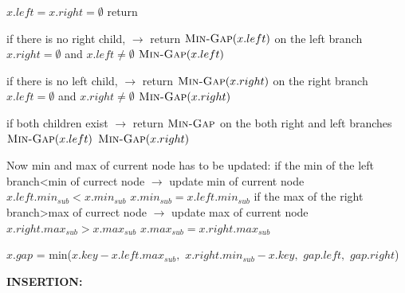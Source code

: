 \documentclass[11pt]{article}
\begin{document}
\begin{enumerate}
\begin{codebox}
		\li \If $x.left=x.right=\emptyset$ 
		\li \Do 
				return 
			\End
		
		\li \Comment if there is no right child, $\rightarrow$ return $\textnormal{\scshape Min-Gap}(x.left)$ on the left branch 
		\li \ElseIf $x.right=\emptyset$ and $x.left \neq \emptyset$ 	
		\li \Do
				$\textnormal{\scshape Min-Gap}(x.left)$		 	

		\li \Comment if there is no left child, $\rightarrow$ return $\textnormal{\scshape Min-Gap}(x.right)$ on the right branch 
		\li \ElseIf $x.left=\emptyset$ and $x.right \neq \emptyset$ 	
		\li \Do
				$\textnormal{\scshape Min-Gap}(x.right)$

		\li \Comment if both children exist $\rightarrow$ return $\textnormal{\scshape Min-Gap}$ on the both right and left branches 
		\li \Else 	
		\li \Do
				$\textnormal{\scshape Min-Gap}(x.left)$
			\li $\textnormal{\scshape Min-Gap}(x.right)$
		\End
		
		\li \Comment Now min and max of current node has to be updated:
		\li \Comment if the min of the left branch<min of currect node $\rightarrow$ update min of current node
	 	\li \If $x.left.min_{sub} < x.min_{sub}$
		 	\li \Do 
			 	$ x.min_{sub}= x.left.min_{sub}$
			\End
		\li \Comment if the max of the right branch>max of currect node $\rightarrow$ update max of current node
		\li \If $x.right.max_{sub} > x.max_{sub}$
		 	\li \Do 
			 	$ x.max_{sub}= x.right.max_{sub}$
			\End


		\li $x.gap$ = min($x.key-x.left.max_{sub},$ 
		\li \hspace{21mm} $x.right.min_{sub}-x.key,$		 		
		\li \hspace{21mm} $gap.left,$
		\li \hspace{21mm} $gap.right$)	
		
		
		
	\end{codebox}

	
	
	
	
\pagebreak

	\textbf{INSERTION:} 


\end{enumerate}
\end{document}
